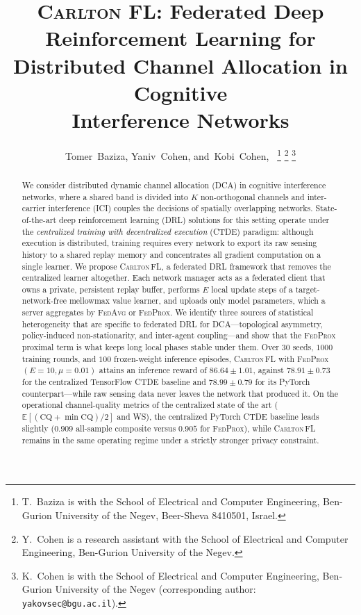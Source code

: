 \documentclass[journal]{IEEEtran}
\newcommand{\OURS}{\textsc{Carlton\,FL}}
\newcommand{\FedAvg}{\textsc{FedAvg}}
\newcommand{\FedProx}{\textsc{FedProx}}
\begin{document}
\title{\textsc{Carlton FL}: Federated Deep Reinforcement Learning for\\
Distributed Channel Allocation in Cognitive\\
Interference Networks}

\author{Tomer~Baziza,
        Yaniv~Cohen,
        and~Kobi~Cohen,~%
\thanks{T.~Baziza is with the School of Electrical and Computer Engineering,
Ben-Gurion University of the Negev, Beer-Sheva 8410501, Israel.}%
\thanks{Y.~Cohen is a research assistant with the School of Electrical and
Computer Engineering, Ben-Gurion University of the Negev.}%
\thanks{K.~Cohen is with the School of Electrical and Computer Engineering,
Ben-Gurion University of the Negev (corresponding author:
\texttt{yakovsec@bgu.ac.il}).}}

\maketitle

\begin{abstract}
We consider distributed dynamic channel allocation (DCA) in cognitive
interference networks, where a shared band is divided into $K$ non-orthogonal
channels and inter-carrier interference (ICI) couples the decisions of
spatially overlapping networks. State-of-the-art deep reinforcement learning
(DRL) solutions for this setting operate under the \emph{centralized training
with decentralized execution} (CTDE) paradigm: although execution is
distributed, training requires every network to export its raw sensing history
to a shared replay memory and concentrates all gradient computation on a single
learner. We propose \OURS{}, a federated DRL framework that removes the
centralized learner altogether. Each network manager acts as a federated client
that owns a private, persistent replay buffer, performs $E$ local update steps
of a target-network-free mellowmax value learner, and uploads only model
parameters, which a server aggregates by \FedAvg{} or \FedProx{}. We identify
three sources of statistical heterogeneity that are specific to federated DRL
for DCA---topological asymmetry, policy-induced non-stationarity, and
inter-agent coupling---and show that the \FedProx{} proximal term is what keeps
long local phases stable under them. Over $30$ seeds, $1000$ training rounds,
and $100$ frozen-weight inference episodes, \OURS{} with \FedProx{}
$(E{=}10,\mu{=}0.01)$ attains an inference reward of $86.64\pm 1.01$, against
$78.91\pm 0.73$ for the centralized TensorFlow CTDE baseline and
$78.99\pm 0.79$ for its PyTorch counterpart---while raw sensing data never
leaves the network that produced it. On the operational channel-quality
metrics of the centralized state of the art
($\mathbb{E}[(\mathrm{CQ}+\min\mathrm{CQ})/2]$ and WS), the centralized
PyTorch CTDE baseline leads slightly ($0.909$ all-sample composite versus
$0.905$ for \FedProx{}), while \OURS{} remains in the same operating regime
under a strictly stronger privacy constraint.
\end{abstract}
\end{document}
